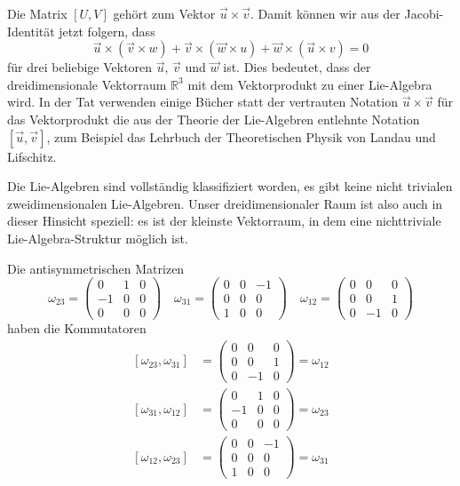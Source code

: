 Die Matrix $[U,V]$ gehört zum Vektor $\vec u\times\vec v$.
Damit können wir aus der Jacobi-Identität jetzt folgern, dass
\[
\vec u\times(\vec v\times w)
+
\vec v\times(\vec w\times u)
+
\vec w\times(\vec u\times v)
=0
\]
für drei beliebige Vektoren $\vec u$, $\vec v$ und $\vec w$ ist.
Dies bedeutet, dass der dreidimensionale Vektorraum $\mathbb R^3$
mit dem Vektorprodukt zu einer Lie-Algebra wird.
In der Tat verwenden einige Bücher statt der vertrauten Notation
$\vec u\times \vec v$ für das Vektorprodukt die aus der Theorie der
Lie-Algebren entlehnte Notation $[\vec u,\vec v]$, zum Beispiel
das Lehrbuch der Theoretischen Physik \cite{skript:landaulifschitz1}
von Landau und Lifschitz.

Die Lie-Algebren sind vollständig klassifiziert worden, es gibt
keine nicht trivialen zweidimensionalen Lie-Algebren.
Unser dreidimensionaler Raum ist also auch in dieser Hinsicht speziell:
es ist der kleinste Vektorraum, in dem eine nichttriviale Lie-Algebra-Struktur
möglich ist.

Die antisymmetrischen Matrizen
\[
\omega_{23}
=
\begin{pmatrix} 0&1&0\\-1&0&0\\0&0&0\end{pmatrix}
\quad
\omega_{31}
=
\begin{pmatrix} 0&0&-1\\0&0&0\\1&0&0\end{pmatrix}
\quad
\omega_{12}
=
\begin{pmatrix} 0&0&0\\0&0&1\\0&-1&0\end{pmatrix}
\]
haben die Kommutatoren
\begin{equation}
\begin{aligned}
[\omega_{23},\omega_{31}]
&=
\begin{pmatrix}
0&0&0\\
0&0&1\\
0&-1&0
\end{pmatrix}
=
\omega_{12}
\\
[\omega_{31},\omega_{12}]
&=
\begin{pmatrix}
0&1&0\\
-1&0&0\\
0&0&0
\end{pmatrix}
=
\omega_{23}
\\
[\omega_{12},\omega_{23}]
&=
\begin{pmatrix}
0&0&-1\\
0&0&0\\
1&0&0
\end{pmatrix}
=
\omega_{31}
\end{aligned}
\label{buch:gruppen:eqn:so3-kommutatoren}
\end{equation}


